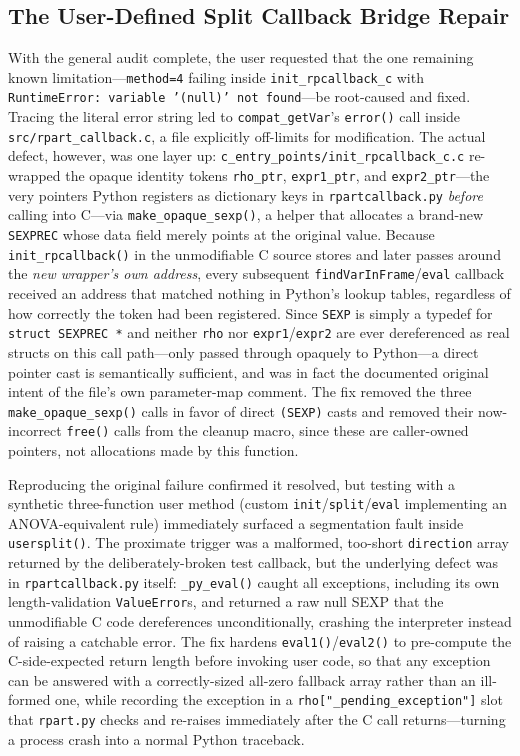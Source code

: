 \documentclass[12pt]{article}
\begin{document}
\subsection{The User-Defined Split Callback Bridge Repair}

With the general audit complete, the user requested that the one remaining known limitation---\texttt{method=4} failing inside \texttt{init\_rpcallback\_c} with \texttt{RuntimeError: variable '(null)' not found}---be root-caused and fixed. Tracing the literal error string led to \texttt{compat\_getVar}'s \texttt{error()} call inside \texttt{src/rpart\_callback.c}, a file explicitly off-limits for modification. The actual defect, however, was one layer up: \texttt{c\_entry\_points/init\_rpcallback\_c.c} re-wrapped the opaque identity tokens \texttt{rho\_ptr}, \texttt{expr1\_ptr}, and \texttt{expr2\_ptr}---the very pointers Python registers as dictionary keys in \texttt{rpartcallback.py} \emph{before} calling into C---via \texttt{make\_opaque\_sexp()}, a helper that allocates a brand-new \texttt{SEXPREC} whose data field merely points at the original value. Because \texttt{init\_rpcallback()} in the unmodifiable C source stores and later passes around the \emph{new wrapper's own address}, every subsequent \texttt{findVarInFrame}/\texttt{eval} callback received an address that matched nothing in Python's lookup tables, regardless of how correctly the token had been registered. Since \texttt{SEXP} is simply a typedef for \texttt{struct SEXPREC *} and neither \texttt{rho} nor \texttt{expr1}/\texttt{expr2} are ever dereferenced as real structs on this call path---only passed through opaquely to Python---a direct pointer cast is semantically sufficient, and was in fact the documented original intent of the file's own parameter-map comment. The fix removed the three \texttt{make\_opaque\_sexp()} calls in favor of direct \texttt{(SEXP)} casts and removed their now-incorrect \texttt{free()} calls from the cleanup macro, since these are caller-owned pointers, not allocations made by this function.

Reproducing the original failure confirmed it resolved, but testing with a synthetic three-function user method (custom \texttt{init}/\texttt{split}/\texttt{eval} implementing an ANOVA-equivalent rule) immediately surfaced a segmentation fault inside \texttt{usersplit()}. The proximate trigger was a malformed, too-short \texttt{direction} array returned by the deliberately-broken test callback, but the underlying defect was in \texttt{rpartcallback.py} itself: \texttt{\_py\_eval()} caught all exceptions, including its own length-validation \texttt{ValueError}s, and returned a raw null SEXP that the unmodifiable C code dereferences unconditionally, crashing the interpreter instead of raising a catchable error. The fix hardens \texttt{eval1()}/\texttt{eval2()} to pre-compute the C-side-expected return length before invoking user code, so that any exception can be answered with a correctly-sized all-zero fallback array rather than an ill-formed one, while recording the exception in a \texttt{rho["\_pending\_exception"]} slot that \texttt{rpart.py} checks and re-raises immediately after the C call returns---turning a process crash into a normal Python traceback.
\end{document}

